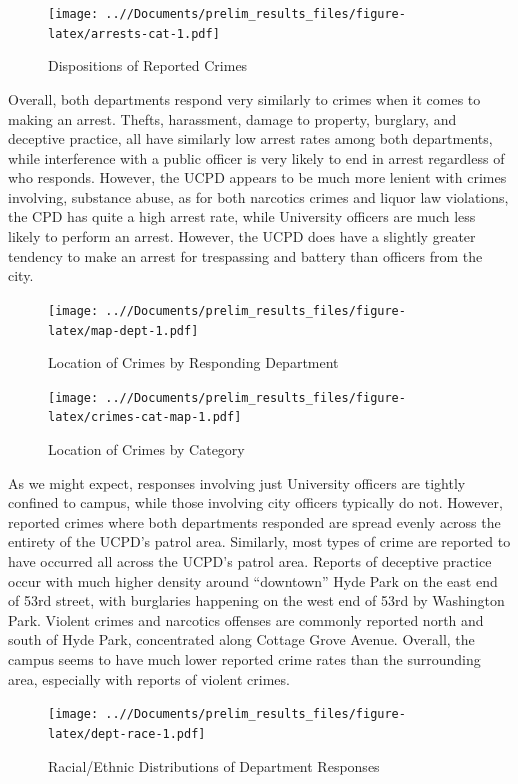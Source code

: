 \documentclass{ucetd}
\begin{document}
\begin{figure}
\centering
\texttt{[image: ..//Documents/prelim\_results\_files/figure-latex/arrests-cat-1.pdf]}
\caption{Dispositions of Reported Crimes}
\end{figure}

Overall, both departments respond very similarly to crimes when it comes
to making an arrest. Thefts, harassment, damage to property, burglary,
and deceptive practice, all have similarly low arrest rates among both
departments, while interference with a public officer is very likely to
end in arrest regardless of who responds. However, the UCPD appears to
be much more lenient with crimes involving, substance abuse, as for both
narcotics crimes and liquor law violations, the CPD has quite a high
arrest rate, while University officers are much less likely to perform
an arrest. However, the UCPD does have a slightly greater tendency to
make an arrest for trespassing and battery than officers from the city.

\begin{figure}
\centering
\texttt{[image: ..//Documents/prelim\_results\_files/figure-latex/map-dept-1.pdf]}
\caption{Location of Crimes by Responding Department}
\end{figure}

\begin{figure}
\centering
\texttt{[image: ..//Documents/prelim\_results\_files/figure-latex/crimes-cat-map-1.pdf]}
\caption{Location of Crimes by Category}
\end{figure}

As we might expect, responses involving just University officers are
tightly confined to campus, while those involving city officers
typically do not. However, reported crimes where both departments
responded are spread evenly across the entirety of the UCPD's patrol
area. Similarly, most types of crime are reported to have occurred all
across the UCPD's patrol area. Reports of deceptive practice occur with
much higher density around ``downtown'' Hyde Park on the east end of
53rd street, with burglaries happening on the west end of 53rd by
Washington Park. Violent crimes and narcotics offenses are commonly
reported north and south of Hyde Park, concentrated along Cottage Grove
Avenue. Overall, the campus seems to have much lower reported crime
rates than the surrounding area, especially with reports of violent
crimes.

\begin{figure}
\centering
\texttt{[image: ..//Documents/prelim\_results\_files/figure-latex/dept-race-1.pdf]}
\caption{Racial/Ethnic Distributions of Department Responses}
\end{figure}
\end{document}
